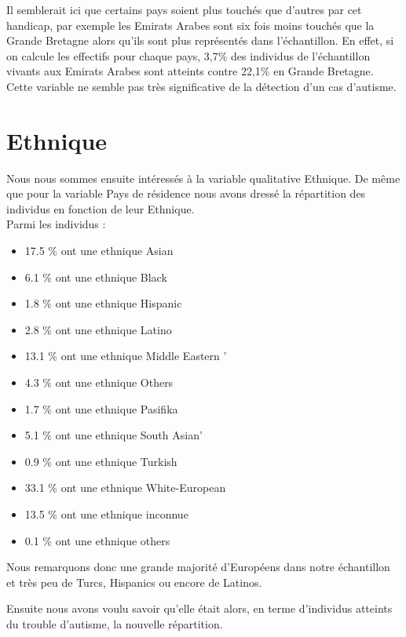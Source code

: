 \documentclass[12,french]{report}
\begin{document}
	Il semblerait ici que certains pays soient plus touchés que d’autres par cet handicap, par exemple les Emirats Arabes sont six fois moins touchés que la Grande Bretagne alors qu’ils sont plus représentés dans l’échantillon. En effet, si on calcule les effectifs pour chaque pays, 3,7\% des individus de l’échantillon vivants aux Emirats Arabes sont atteints contre 22,1\% en Grande Bretagne. Cette variable ne semble pas très significative de la détection d’un cas d’autisme.

\section{Ethnique}
	Nous nous sommes ensuite intéressés à la variable qualitative Ethnique. De même que pour la variable Pays de résidence nous avons dressé la répartition des individus en fonction de leur Ethnique.\\

	Parmi les individus :
\begin{itemize}
	\item 17.5 \% ont une ethnique  Asian
	\item 6.1 \% ont une ethnique  Black
	\item 1.8 \% ont une ethnique  Hispanic
	\item 2.8 \% ont une ethnique  Latino
	\item 13.1 \% ont une ethnique  Middle Eastern '
	\item 4.3 \% ont une ethnique  Others
	\item 1.7 \% ont une ethnique  Pasifika
	\item 5.1 \% ont une ethnique  South Asian'
	\item 0.9 \% ont une ethnique  Turkish
	\item 33.1 \% ont une ethnique  White-European
	\item 13.5 \% ont une ethnique  inconnue
	\item 0.1 \% ont une ethnique  others
\end{itemize}\vspace{0.3cm}

	Nous remarquons donc une grande majorité d’Européens dans notre échantillon et très peu de Turcs, Hispanics ou encore de Latinos.
	
	Ensuite nous avons voulu savoir qu’elle était alors, en terme d'individus atteints du trouble d’autisme, la nouvelle répartition.\\
	
\end{document}

